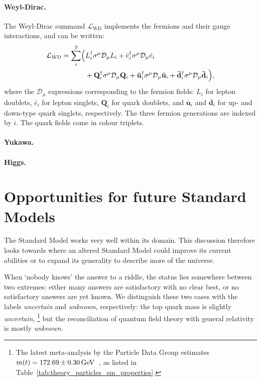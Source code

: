 \paragraph{Weyl-Dirac.}
The Weyl-Dirac summand $\mathcal{L}_\mathrm{WD}$ implements the fermions and
their gauge interactions, and can be written:
\begin{equation}
\begin{split}
\mathcal{L}_\mathrm{WD} =
\sum_i^3
\Bigl(
& L^\dagger_i \sigma^\mu \mathcal{D}_\mu L_i
+ \bar e^\dagger_i \sigma^\mu \mathcal{D}_\mu \bar e_i \\
& + \mathbf{Q}^\dagger_i \sigma^\mu \mathcal{D}_\mu \mathbf{Q}_i
+ \mathbf{\bar u}^\dagger_i \sigma^\mu \mathcal{D}_\mu \mathbf{\bar u}_i
+ \mathbf{\bar d}^\dagger_i \sigma^\mu \mathcal{D}_\mu \mathbf{\bar d}_i
\Bigr)
,
\end{split}
\end{equation}
where the $\mathcal{D}_\mu$ expressions corresponding to the fermion fields:
$L_i$ for lepton doublets,
$\bar e_i$ for lepton singlets,
$\mathbf{Q}_i$ for quark doublets,
and $\mathbf{\bar u}_i$ and $\mathbf{\bar d}_i$ for up- and down-type quark
singlets, respectively.
The three fermion generations are indexed by $i$.
The quark fields come in colour triplets.

\paragraph{Yukawa.} \TODO{}

\paragraph{Higgs.} \TODO{}


\section{Opportunities for future Standard Models}
The Standard Model works very well within its domain.
This discussion therefore looks towards where an altered Standard Model could
improve its current abilities or to expand its generality to describe more of
the universe.

When `nobody knows' the answer to a riddle, the status lies somewhere between
two extremes:
either many answers are satisfactory with no clear best,
or no satisfactory answers are yet known.
We distinguish these two cases with the labels
\emph{uncertain} and \emph{unknown}, respectively:
the top quark mass is slightly \emph{uncertain},%
\footnote{%
The latest meta-analysis by the Particle Data Group estimates
$m(t) = 172.69 \pm 0.30\,\eV[G]$~\cite{pdg2022ynf}, as listed in
Table~\ref{tab:theory_particles_sm_properties}.
}
but the reconciliation of quantum field theory with general relativity is
mostly \emph{unknown}.

